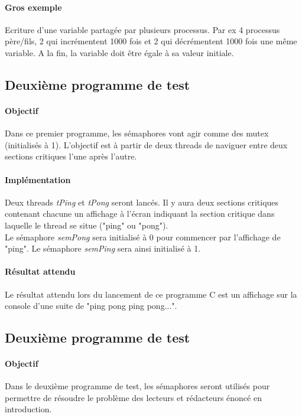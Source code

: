 \documentclass[12pt]{article}
\begin{document}
\paragraph{Gros exemple}
Ecriture d'une variable partagée par plusieurs processus. Par ex 4 processus père/fils, 2 qui incrémentent 1000 fois et 2 qui décrémentent 1000 fois une même variable. A la fin, la variable doit être égale à sa valeur initiale.


\newpage
\subsection{Deuxième programme de test}
\paragraph{Objectif\\}
Dans ce premier programme, les sémaphores vont agir comme des mutex (initialisés à 1). L'objectif est à partir de deux threads de naviguer entre deux sections critiques l'une après l'autre.
\paragraph{Implémentation\\}
Deux threads \textit{tPing} et \textit{tPong} seront lancés. Il y aura deux sections critiques contenant chacune un affichage à l'écran indiquant la section critique dans laquelle le thread se situe ("ping" ou "pong"). \\
Le sémaphore \textit{semPong} sera initialisé à 0 pour commencer par l'affichage de "ping". Le sémaphore \textit{semPing} sera ainsi initialisé à 1.
\paragraph{Résultat attendu\\}
Le résultat attendu lors du lancement de ce programme C est un affichage sur la console d'une suite de "ping pong ping pong...".
\newpage
\subsection{Deuxième programme de test}
\paragraph{Objectif\\}
Dans le deuxième programme de test, les sémaphores seront utilisés pour permettre de résoudre le problème des lecteurs et rédacteurs énoncé en introduction.
\end{document}
